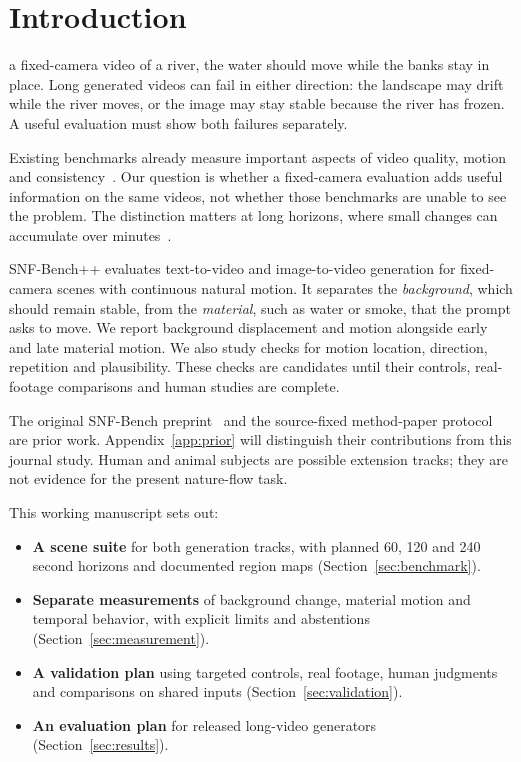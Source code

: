 \section{Introduction}

 a fixed-camera video of a river, the water should move while the banks stay in place. Long generated videos can fail in either direction: the landscape may drift while the river moves, or the image may stay stable because the river has frozen. A useful evaluation must show both failures separately.

Existing benchmarks already measure important aspects of video quality, motion and consistency~\cite{huang2023vbench,huang2024vbench++,Zheng2025VBench20AV,liu2024evalcrafter,duan2025worldscore}. Our question is whether a fixed-camera evaluation adds useful information on the same videos, not whether those benchmarks are unable to see the problem. The distinction matters at long horizons, where small changes can accumulate over minutes~\cite{huang2025selfforcing,liu2025rolling,yang2025longlive,helios,li2025stable}.

SNF-Bench++ evaluates text-to-video and image-to-video generation for fixed-camera scenes with continuous natural motion. It separates the \emph{background}, which should remain stable, from the \emph{material}, such as water or smoke, that the prompt asks to move. We report background displacement and motion alongside early and late material motion. We also study checks for motion location, direction, repetition and plausibility. These checks are candidates until their controls, real-footage comparisons and human studies are complete.

The original SNF-Bench preprint~\cite{minar2026snfbench} and the source-fixed method-paper protocol are prior work. Appendix~\ref{app:prior} will distinguish their contributions from this journal study. Human and animal subjects are possible extension tracks; they are not evidence for the present nature-flow task.

This working manuscript sets out:
\begin{itemize}
\item \textbf{A scene suite} for both generation tracks, with planned 60, 120 and 240 second horizons and documented region maps (Section~\ref{sec:benchmark}).
\item \textbf{Separate measurements} of background change, material motion and temporal behavior, with explicit limits and abstentions (Section~\ref{sec:measurement}).
\item \textbf{A validation plan} using targeted controls, real footage, human judgments and comparisons on shared inputs (Section~\ref{sec:validation}).
\item \textbf{An evaluation plan} for released long-video generators (Section~\ref{sec:results}). 
\end{itemize}
